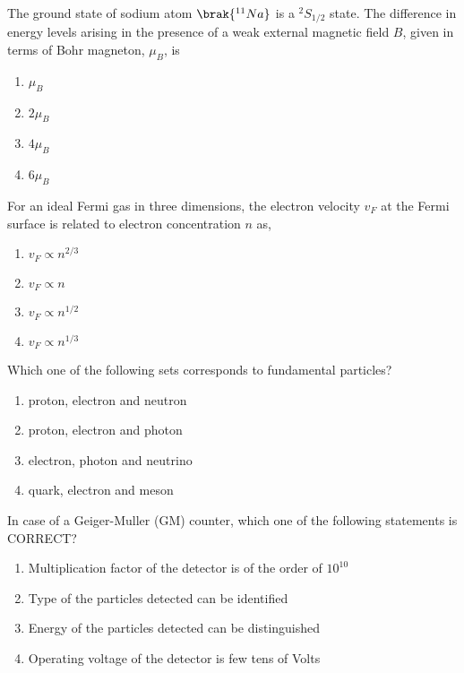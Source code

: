 \item The ground state of sodium atom $\brak{^{11}Na}$ is a $^{2} S_{1/2}$ state. The difference in energy levels arising in the presence of a weak external magnetic field $B$, given in terms of Bohr magneton, $\mu_B$, is
\begin{multicols}{2}
    \begin{enumerate}
        \item $\mu_B$ 
        \item $2 \mu_B$
        \item $4 \mu_B$
        \item $6 \mu_B$
    \end{enumerate}
\end{multicols}

\item For an ideal Fermi gas in three dimensions, the electron velocity $v_F$ at the Fermi surface is related
to electron concentration $n$ as, 
\begin{multicols}{2}
    \begin{enumerate}
        \item $v_F \propto n^{2/3}$
        \item $v_F \propto n$
        \item $v_F \propto n^{1/2}$
        \item $v_F \propto n^{1/3}$
    \end{enumerate}
\end{multicols}

\item Which one of the following sets corresponds to fundamental particles?
\begin{multicols}{2}
    \begin{enumerate}
        \item proton, electron and neutron
        \item proton, electron and photon
        \item electron, photon and neutrino
        \item quark, electron and meson
    \end{enumerate}
\end{multicols}

\item In case of a Geiger-Muller (GM) counter, which one of the following statements is CORRECT?
\begin{multicols}{2}
    \begin{enumerate}
        \item Multiplication factor of the detector is of the order of $10^{10}$
        \item Type of the particles detected can be identified
        \item Energy of the particles detected can be distinguished
        \item Operating voltage of the detector is few tens of Volts
    \end{enumerate}
\end{multicols}

